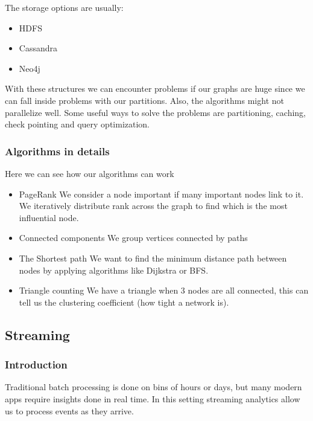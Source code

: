 The storage options are usually:
\begin{itemize}
    \item HDFS
    \item Cassandra
    \item Neo4j
\end{itemize}

With these structures we can encounter problems if our graphs are huge since we can fall inside problems with our partitions. Also, the algorithms might not parallelize well. Some useful ways to solve the problems are partitioning, caching, check pointing and query optimization. 

\subsubsection{Algorithms in details}

Here we can see how our algorithms can work

\begin{itemize}
    \item PageRank \ra We consider a node important if many important nodes link to it. We iteratively distribute rank across the graph to find which is the most influential node. 
    \item Connected components \ra We group vertices connected by paths
    \item The Shortest path \ra We want to find the minimum distance path between nodes by applying algorithms like Dijkstra or BFS. 
    \item Triangle counting \ra We have a triangle when 3 nodes are all connected, this can tell us the clustering coefficient (how tight a network is).
\end{itemize}

\subsection{Streaming}

\subsubsection{Introduction}

Traditional batch processing is done on bins of hours or days, but many modern apps require insights done in real time. In this setting streaming analytics allow us to process events as they arrive. 

\vspace{10pt}

